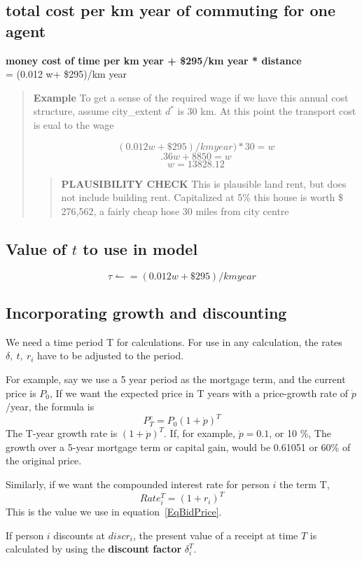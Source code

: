 \subsection{total cost per km year of commuting for one agent}
\textbf{money cost of time per km year + \$295/km year * distance} \\
= (0.012 w+ \$295)/km year 
    \begin{quotation}
    \textbf{Example}
    To get a sense of the required wage if we have this annual cost structure, assume city\_extent $d^*$ is 30 km. At this point the transport cost is  eual to the wage

\[(0.012 w+ \$295)/km year)*30 =  w\] 
\[.36w+ 8850=w\]
\[w=13828.12\]
        \begin{quotation}
        \textbf{PLAUSIBILITY CHECK}
This is plausible land rent, but does not include building rent. 
Capitalized at 5\% this house is worth \$ 276,562, a fairly cheap hose 30 miles from city centre
        \end{quotation}
    \end{quotation}

{\color{red}
\subsection{Value of $t$ to use in model}
\[ \tau\leftharpoonup=(0.012 w+ \$295)/km year \]}


\subsection{Incorporating growth and discounting}
We need a time period T for calculations. For use in any calculation, the rates $\delta,\ t,\ r_i$ have to be adjusted to the period.

For example, say we use  a 5 year period as the mortgage term, and the current price is $P_0$, If we want the expected price in  T years   with a price-growth rate of $\dot p$ /year, the formula is 
\[P^e_T=P_0(1+\dot p)^T\]
The T-year growth rate is $(1+\dot p)^T$. If, for example, $\dot p= 0.1$, or 10 \%, The growth  over a 5-year mortgage term or capital gain, would be 0.61051 or 60\% of the original price.

Similarly, if we want the compounded interest rate for person $i$ the term T,
\[Rate_i^T=(1+r_i)^T\]
This is the value we use in equation~\ref{EqBidPrice}.


If person $i$  discounts at $discr_i$, the present value of  a receipt at time $T$ is calculated by using the \textbf{discount factor} $\delta_i^T$.

